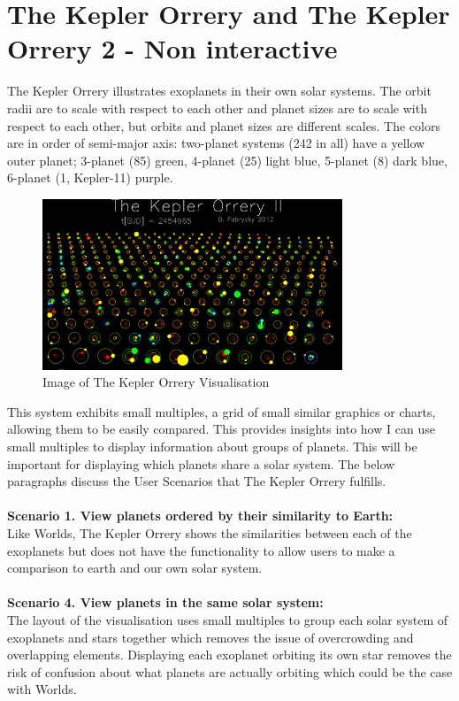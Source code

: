 \section{The Kepler Orrery and The Kepler Orrery 2 - Non interactive}
The Kepler Orrery \cite{orrery} illustrates exoplanets in their
own solar systems. The orbit radii are to scale with respect to each other and
planet sizes are to scale with respect to each other, but orbits and planet
sizes are different scales. The colors are in order of semi-major axis:
two-planet systems (242 in all) have a yellow outer planet; 3-planet (85) green,
4-planet (25) light blue, 5-planet (8) dark blue, 6-planet (1, Kepler-11)
purple. 
\begin{figure}[H]
  \centering
      \includegraphics[width=0.8\textwidth]{images/orrery.jpg}
  \caption{Image of The Kepler Orrery Visualisation}
\end{figure}
This system exhibits small multiples, a grid of small similar graphics or
charts, allowing them to be easily compared. This provides insights into how I
can use small multiples to display information about groups of planets. This
will be important for displaying which planets share a solar system. The below
paragraphs discuss the User Scenarios that The Kepler Orrery fulfills.
\\\\
{\bf Scenario 1. View planets ordered by their similarity to Earth:\\}
Like Worlds, The Kepler Orrery shows the similarities between each of the
exoplanets but does not have the functionality to allow users to make a
comparison to earth and our own solar system.
\\\\
{\bf Scenario 4. View planets in the same solar system:\\}
The layout of the visualisation uses small multiples to group each solar system
of exoplanets and stars together which removes the issue of overcrowding and
overlapping elements. Displaying each exoplanet
orbiting its own star removes the risk of confusion about what planets are
actually orbiting which could be the case with Worlds.

